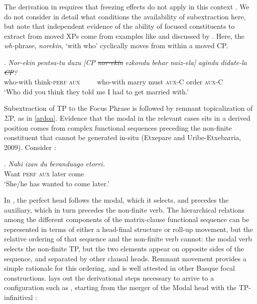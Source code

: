 \documentclass[output=paper]{langscibook}
\begin{document}
The derivation in \Last requires that freezing effects do not apply in this context \citep{collins2005b, collins2005a}.  We do not consider in detail what conditions the availability of subextraction here, but note that independent evidence of the ability of focused constituents to extract from moved XPs come from examples like \Next and discussed by \cite{elordieta2008}.  Here, the \textit{wh-}phrase, \textit{norekin}, `with who' cyclically moves from within a moved CP.

\exig.  \textit{Nor-ekin} \textit{pentsa-tu} \textit{duzu} \textit{[CP} \textit{\st{nor-ekin}} \textit{ezkondu} \textit{behar} \textit{naiz-ela]} \textit{agindu} \textit{didate-la} \textit{\st{CP}?}\\
          who-with think-\textsc{perf} \textsc{aux} \textcolor{white}{text}  who-with marry must \textsc{aux-C} order \textsc{aux-C}\\
`Who did you think they told me I had to get married with.'


Subextraction of TP to the Focus Phrase is followed by remnant topicalization of $\Sigma$P, as in \protect\ref{ardoa}. Evidence that the modal in the relevant cases sits in a derived position comes from complex functional sequences preceding the non-finite constituent that cannot be generated in-situ (Etxepare and Uribe-Etxebarria, 2009). Consider \Next:

	
\exg. \textit{Nahi} \textit{izan}   \textit{du}   \textit{beranduago} \textit{etorri.}	\\
        Want \textsc{perf} \textsc{aux} later            come\\
        		`She/he has wanted to come later.' 


In \Last, the perfect head follows the modal, which it selects, and precedes the auxiliary, which in turn precedes the non-finite verb. The hierarchical relations among the different components of the matrix-clause functional sequence can be represented in terms of either a head-final structure or roll-up movement, but the relative ordering of that sequence and the non-finite verb cannot: the modal verb selects the non-finite TP, but the two elements appear on opposite sides of the sequence, and separated by other clausal heads. Remnant movement provides a simple rationale for this ordering, and is well attested in other Basque focal constructions. \Next lays out the derivational steps necessary to arrive to a configuration such as \Last, starting from the merger of the Modal head with the TP-infinitival \Next[a]:
\end{document}
